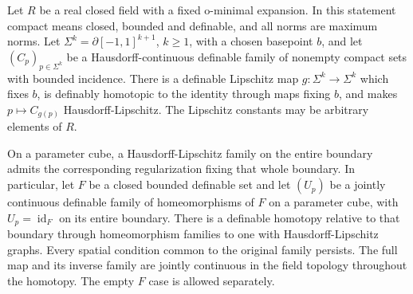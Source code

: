 \begin{corollary}
\label{cor:based-sphere-hausdorff}
Let $R$ be a real closed field with a fixed o-minimal expansion.
In this statement compact means closed, bounded and definable, and
all norms are maximum norms.  Let
$\Sigma^k=\partial[-1,1]^{k+1}$, $k\ge1$, with a chosen basepoint $b$,
and let $(C_p)_{p\in\Sigma^k}$ be a Hausdorff-continuous definable
family of nonempty compact sets with bounded incidence.
There is a definable Lipschitz map $g:\Sigma^k\to\Sigma^k$ which
fixes $b$, is definably homotopic to the identity through maps fixing
$b$, and makes $p\mapsto C_{g(p)}$ Hausdorff-Lipschitz.
The Lipschitz constants may be arbitrary elements of $R$.

On a parameter cube, a Hausdorff-Lipschitz family on the entire
boundary admits the corresponding regularization fixing that
whole boundary.  In particular, let $F$ be a closed bounded
definable set and let $(U_p)$ be a jointly continuous definable
family of homeomorphisms of $F$ on a parameter cube, with
$U_p=\operatorname{id}_F$ on its entire boundary.
There is a definable homotopy relative to that boundary through
homeomorphism families to one with Hausdorff-Lipschitz graphs.
Every spatial condition common to the original family persists.
The full map and its inverse family are jointly continuous in
the field topology throughout the homotopy.  The empty $F$ case
is allowed separately.
\end{corollary}

